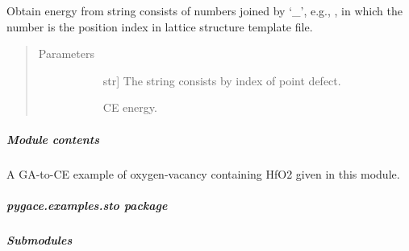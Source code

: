 \documentclass[letterpaper,10pt,english]{sphinxmanual}
\begin{document}
\begin{fulllineitems}
\begin{fulllineitems}
\begin{quote}
\begin{description}
\end{description}\end{quote}

\end{fulllineitems}


\begin{fulllineitems}
\label{\detokenize{pygace.examples.hfo2:pygace.examples.hfo2.hfo2_gace.Runner.str2energy}}
Obtain energy from string consists of numbers joined by ‘\_’, e.g.,
, in which the number is the position index in lattice
structure template file.
\begin{quote}\begin{description}
\item[{Parameters}] \leavevmode\begin{description}
\item[{}] \leavevmode{[}str{]}
The string consists by index of point defect.

\item[{}] \leavevmode
\item[{}] \leavevmode
\item[{}] \leavevmode
CE energy.

\end{description}

\end{description}\end{quote}

\end{fulllineitems}


\end{fulllineitems}



\subparagraph{Module contents}
\label{\detokenize{pygace.examples.hfo2:module-contents}}\label{\detokenize{pygace.examples.hfo2:module-pygace.examples.hfo2}}
A GA-to-CE example of oxygen-vacancy containing HfO2 given in this module.


\subparagraph{pygace.examples.sto package}
\label{\detokenize{pygace.examples.sto:pygace-examples-sto-package}}\label{\detokenize{pygace.examples.sto::doc}}

\subparagraph{Submodules}
\label{\detokenize{pygace.examples.sto:submodules}}
\end{document}
